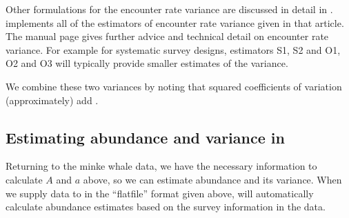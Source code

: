 \documentclass[article]{jss}\usepackage[]{graphicx}\usepackage[]{color}
\begin{document}
Other formulations for the encounter rate variance are discussed in detail in \cite{Fewster:2009ku}.  implements all of the estimators of encounter rate variance given in that article. The  manual page gives further advice and technical detail on encounter rate variance. For example for systematic survey designs, estimators S1, S2 and O1, O2 and O3 will typically provide smaller estimates of the variance.

We combine these two variances by noting that squared coefficients of variation (approximately) add \citep[often referred to as ``the delta method'';][]{seber2002estimation}.


\subsection[Estimating abundance and variance in R]{Estimating abundance and variance in }

Returning to the minke whale data, we have the necessary information to calculate $A$ and $a$ above, so we can estimate abundance and its variance. When we supply data to  in the ``flatfile'' format given above,  will automatically calculate abundance estimates based on the survey information in the data.
\end{document}
